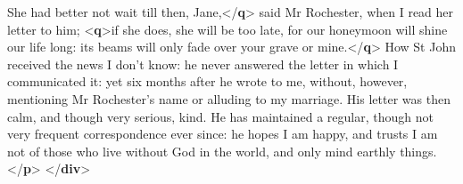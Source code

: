 \documentclass[11pt,twoside]{article}\makeatletter
\begin{document}
\begin{shaded}
\mbox{}\newline 
\hspace*{6pt}She had better not wait till then, Jane,{</\textbf{q}>} said Mr\mbox{}\newline 
\hspace*{6pt}\hspace*{6pt} Rochester, when I read her letter to him; {<\textbf{q}>}if she does,\mbox{}\newline 
\hspace*{6pt}\hspace*{6pt}\hspace*{6pt}\hspace*{6pt} she will be too late, for our honeymoon will shine our life\mbox{}\newline 
\hspace*{6pt}\hspace*{6pt}\hspace*{6pt}\hspace*{6pt} long: its beams will only fade over your grave or mine.{</\textbf{q}>}\mbox{}\newline 
{}\mbox{}\newline 
{}How St John received the news I don't know: he never\mbox{}\newline 
\hspace*{6pt}\hspace*{6pt} answered the letter in which I communicated it: yet six\mbox{}\newline 
\hspace*{6pt}\hspace*{6pt} months after he wrote to me, without, however, mentioning Mr\mbox{}\newline 
\hspace*{6pt}\hspace*{6pt} Rochester's name or alluding to my marriage. His letter was\mbox{}\newline 
\hspace*{6pt}\hspace*{6pt} then calm, and though very serious, kind. He has maintained\mbox{}\newline 
\hspace*{6pt}\hspace*{6pt} a regular, though not very frequent correspondence ever\mbox{}\newline 
\hspace*{6pt}\hspace*{6pt} since: he hopes I am happy, and trusts I am not of those who\mbox{}\newline 
\hspace*{6pt}\hspace*{6pt} live without God in the world, and only mind earthly things.{</\textbf{p}>}\mbox{}\newline 
{</\textbf{div}>}\end{shaded}\egroup\par \par
\end{document}
